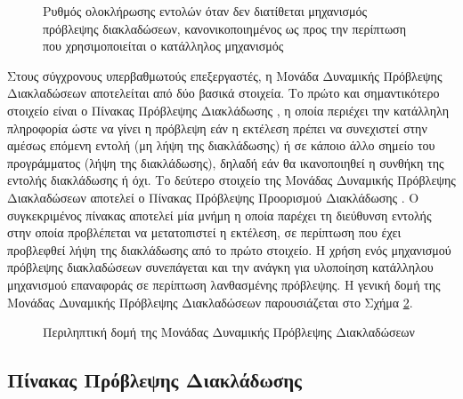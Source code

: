 \begin{figure}[t]
    \centering
    \caption{Ρυθμός ολοκλήρωσης εντολών όταν δεν διατίθεται μηχανισμός πρόβλεψης διακλαδώσεων, κανονικοποιημένος ως προς την περίπτωση που χρησιμοποιείται ο κατάλληλος μηχανισμός}
    \label{fig:chap2_performance_without_prediction}
\end{figure}

Στους σύγχρονους υπερβαθμωτούς επεξεργαστές, η Μονάδα Δυναμικής Πρόβλεψης Διακλαδώσεων \cite{smith1981study} αποτελείται από δύο βασικά στοιχεία. Το πρώτο και σημαντικότερο στοιχείο είναι ο Πίνακας Πρόβλεψης Διακλάδωσης \cite{pan1992improving, quinones2007improving}, η οποία περιέχει την κατάλληλη πληροφορία ώστε να γίνει η πρόβλεψη εάν η εκτέλεση πρέπει να συνεχιστεί στην αμέσως επόμενη εντολή (μη λήψη της διακλάδωσης) ή σε κάποιο άλλο σημείο του προγράμματος (λήψη της διακλάδωσης), δηλαδή εάν θα ικανοποιηθεί η συνθήκη της εντολής διακλάδωσης ή όχι. Το δεύτερο στοιχείο της Μονάδας Δυναμικής Πρόβλεψης Διακλαδώσεων αποτελεί ο Πίνακας Πρόβλεψης Προορισμού Διακλάδωσης \cite{bray1991strategies, perleberg1993branch}. Ο συγκεκριμένος πίνακας αποτελεί μία μνήμη η οποία παρέχει τη διεύθυνση εντολής στην οποία προβλέπεται να μετατοπιστεί η εκτέλεση, σε περίπτωση που έχει προβλεφθεί λήψη της διακλάδωσης από το πρώτο στοιχείο. Η χρήση ενός μηχανισμού πρόβλεψης διακλαδώσεων συνεπάγεται και την ανάγκη για υλοποίηση κατάλληλου μηχανισμού επαναφοράς σε περίπτωση λανθασμένης πρόβλεψης. Η γενική δομή της Μονάδας Δυναμικής Πρόβλεψης Διακλαδώσεων παρουσιάζεται στο Σχήμα \ref{fig:chap2_abstract_predictor}.

\begin{figure}[!b]
    \centering
    \caption{Περιληπτική δομή της Μονάδας Δυναμικής Πρόβλεψης Διακλαδώσεων}
    \label{fig:chap2_abstract_predictor}
\end{figure}


\subsection{Πίνακας Πρόβλεψης Διακλάδωσης}
\label{chap2_BranchPredictor}


